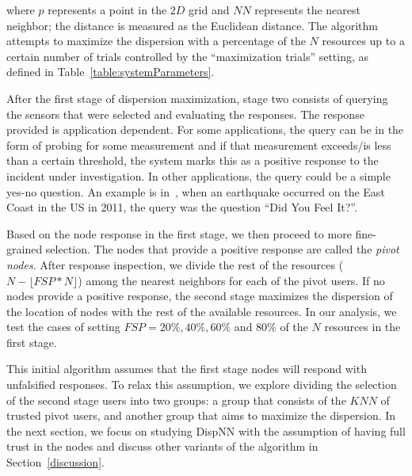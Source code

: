 \documentclass{acm_proc_article-sp}
\newcommand\floor[1]{\lfloor#1\rfloor}
\begin{document}
where $p$ represents a point in the $2D$ grid and $NN$ represents the nearest neighbor; the distance is measured as the Euclidean distance. The algorithm attempts to maximize the dispersion with a percentage of the $N$ resources up to a certain number of trials controlled by the ``maximization trials'' setting, as defined in Table~\ref{table:systemParameters}. \par
After the first stage of dispersion maximization, stage two consists of querying the sensors that were selected and evaluating the responses. The response provided is application dependent. For some applications, the query can be in the form of probing for some measurement and if that measurement exceeds/is less than a certain threshold, the system marks this as a positive response to the incident under investigation. In other applications, the query could be a simple yes-no question. An example is in~\cite{crooks2013earthquake}, when an earthquake occurred on the East Coast in the US in 2011, the query was the question ``Did You Feel It?''.\par

Based on the node response in the first stage, we then proceed to more fine-grained selection. The nodes that provide a positive response are called the \textit{pivot nodes}. After response inspection, we divide the rest of the resources ($N-\floor{FSP*N}$) among the nearest neighbors for each of the pivot users. If no nodes provide a positive response, the second stage maximizes the dispersion of the location of nodes with the rest of the available resources. In our analysis, we test the cases of setting $FSP = 20\%, 40\%, 60\%$ and $80\%$ of the $N$ resources in the first stage. \par

This initial algorithm assumes that the first stage nodes will respond with unfalsified responses. To relax this assumption, we explore dividing the selection of the second stage users into two groups: a group that consists of the $KNN$ of trusted pivot users, and another group that aims to maximize the dispersion. In the next section, we focus on studying DispNN with the assumption of having full trust in the nodes and discuss other variants of the algorithm in Section~\ref{discussion}.\par
\end{document}
